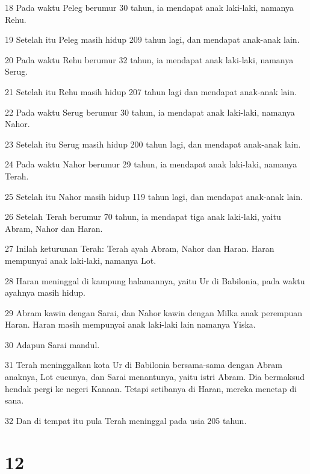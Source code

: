 \par 18 Pada waktu Peleg berumur 30 tahun, ia mendapat anak laki-laki, namanya Rehu.
\par 19 Setelah itu Peleg masih hidup 209 tahun lagi, dan mendapat anak-anak lain.
\par 20 Pada waktu Rehu berumur 32 tahun, ia mendapat anak laki-laki, namanya Serug.
\par 21 Setelah itu Rehu masih hidup 207 tahun lagi dan mendapat anak-anak lain.
\par 22 Pada waktu Serug berumur 30 tahun, ia mendapat anak laki-laki, namanya Nahor.
\par 23 Setelah itu Serug masih hidup 200 tahun lagi, dan mendapat anak-anak lain.
\par 24 Pada waktu Nahor berumur 29 tahun, ia mendapat anak laki-laki, namanya Terah.
\par 25 Setelah itu Nahor masih hidup 119 tahun lagi, dan mendapat anak-anak lain.
\par 26 Setelah Terah berumur 70 tahun, ia mendapat tiga anak laki-laki, yaitu Abram, Nahor dan Haran.
\par 27 Inilah keturunan Terah: Terah ayah Abram, Nahor dan Haran. Haran mempunyai anak laki-laki, namanya Lot.
\par 28 Haran meninggal di kampung halamannya, yaitu Ur di Babilonia, pada waktu ayahnya masih hidup.
\par 29 Abram kawin dengan Sarai, dan Nahor kawin dengan Milka anak perempuan Haran. Haran masih mempunyai anak laki-laki lain namanya Yiska.
\par 30 Adapun Sarai mandul.
\par 31 Terah meninggalkan kota Ur di Babilonia bersama-sama dengan Abram anaknya, Lot cucunya, dan Sarai menantunya, yaitu istri Abram. Dia bermaksud hendak pergi ke negeri Kanaan. Tetapi setibanya di Haran, mereka menetap di sana.
\par 32 Dan di tempat itu pula Terah meninggal pada usia 205 tahun.

\chapter{12}


